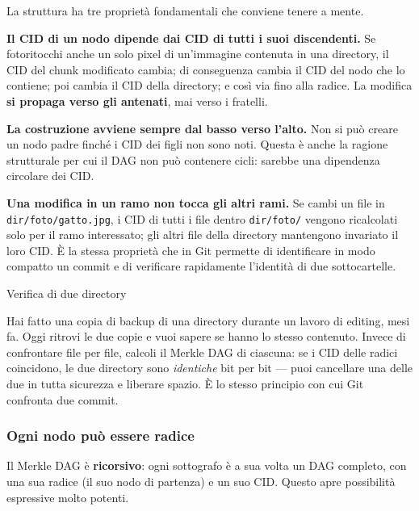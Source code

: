 \documentclass[
  italian,
  openany]{book}
\begin{document}
La struttura ha tre proprietà fondamentali che conviene tenere a mente.

\textbf{Il CID di un nodo dipende dai CID di tutti i suoi discendenti.}
Se fotoritocchi anche un solo pixel di un'immagine contenuta in una
directory, il CID del chunk modificato cambia; di conseguenza cambia il
CID del nodo che lo contiene; poi cambia il CID della directory; e così
via fino alla radice. La modifica \textbf{si propaga verso gli
antenati}, mai verso i fratelli.

\textbf{La costruzione avviene sempre dal basso verso l'alto.} Non si
può creare un nodo padre finché i CID dei figli non sono noti. Questa è
anche la ragione strutturale per cui il DAG non può contenere cicli:
sarebbe una dipendenza circolare dei CID.

\textbf{Una modifica in un ramo non tocca gli altri rami.} Se cambi un
file in \texttt{dir/foto/gatto.jpg}, i CID di tutti i file dentro
\texttt{dir/foto/} vengono ricalcolati solo per il ramo interessato; gli
altri file della directory mantengono invariato il loro CID. È la stessa
proprietà che in Git permette di identificare in modo compatto un commit
e di verificare rapidamente l'identità di due sottocartelle.

\begin{callouttip}{Verifica di due directory}

Hai fatto una copia di backup di una directory durante un lavoro di
editing, mesi fa. Oggi ritrovi le due copie e vuoi sapere se hanno lo
stesso contenuto. Invece di confrontare file per file, calcoli il Merkle
DAG di ciascuna: se i CID delle radici coincidono, le due directory sono
\emph{identiche} bit per bit --- puoi cancellare una delle due in tutta
sicurezza e liberare spazio. È lo stesso principio con cui Git confronta
due commit.

\end{callouttip}

\subsubsection{Ogni nodo può essere
radice}\label{ogni-nodo-puuxf2-essere-radice}

Il Merkle DAG è \textbf{ricorsivo}: ogni sottografo è a sua volta un DAG
completo, con una sua radice (il suo nodo di partenza) e un suo CID.
Questo apre possibilità espressive molto potenti.
\end{document}
